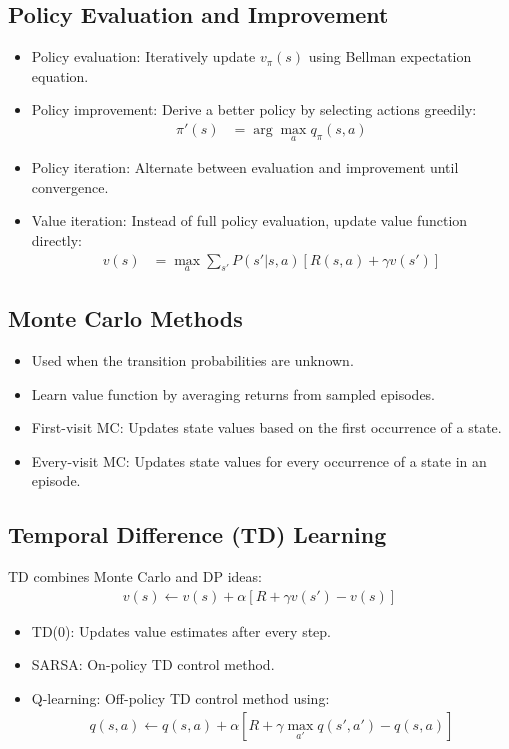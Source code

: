 \documentclass[addpoints]{exam}
\begin{document}
\subsection*{Policy Evaluation and Improvement}
\begin{itemize}
    \item Policy evaluation: Iteratively update $v_\pi(s)$ using Bellman expectation equation.
    \item Policy improvement: Derive a better policy by selecting actions greedily: 
    \begin{align*}
        \pi'(s) &= \arg\max_a q_\pi(s, a)
    \end{align*}
    \item Policy iteration: Alternate between evaluation and improvement until convergence.
    \item Value iteration: Instead of full policy evaluation, update value function directly:
    \begin{align*}
        v(s) &= \max_a \sum_{s'} P(s' | s, a) \left[ R(s, a) + \gamma v(s') \right]
    \end{align*}
\end{itemize}

\subsection*{Monte Carlo Methods}
\begin{itemize}
    \item Used when the transition probabilities are unknown.
    \item Learn value function by averaging returns from sampled episodes.
    \item First-visit MC: Updates state values based on the first occurrence of a state.
    \item Every-visit MC: Updates state values for every occurrence of a state in an episode.
\end{itemize}

\subsection*{Temporal Difference (TD) Learning}
TD combines Monte Carlo and DP ideas:
\begin{align*}
    v(s) \leftarrow v(s) + \alpha \left[ R + \gamma v(s') - v(s) \right]
\end{align*}
\begin{itemize}
    \item TD(0): Updates value estimates after every step.
    \item SARSA: On-policy TD control method.
    \item Q-learning: Off-policy TD control method using: 
    \begin{align*}
        q(s, a) \leftarrow q(s, a) + \alpha \left[ R + \gamma \max_{a'} q(s', a') - q(s, a) \right]
    \end{align*}
\end{itemize}
\end{document}
